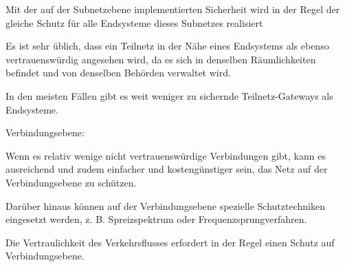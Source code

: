 \documentclass[a4paper]{article}
\begin{document}
\begin{multicols}{3}
\begin{itemize*}
\begin{itemize*}
                  \begin{itemize*}
                        \item Mit der auf der Subnetzebene implementierten Sicherheit wird in der Regel der gleiche Schutz für alle Endsysteme dieses Subnetzes realisiert
                  \end{itemize*}
                  \item Es ist sehr üblich, dass ein Teilnetz in der Nähe eines Endsystems als ebenso vertrauenswürdig angesehen wird, da es sich in denselben Räumlichkeiten befindet und von denselben Behörden verwaltet wird.
                  \item In den meisten Fällen gibt es weit weniger zu sichernde Teilnetz-Gateways als Endsysteme.
            \end{itemize*}
            \item Verbindungsebene:
            \begin{itemize*}
                  \item Wenn es relativ wenige nicht vertrauenswürdige Verbindungen gibt, kann es ausreichend und zudem einfacher und kostengünstiger sein, das Netz auf der Verbindungsebene zu schützen.
                  \item Darüber hinaus können auf der Verbindungsebene spezielle Schutztechniken eingesetzt werden, z. B. Spreizspektrum oder Frequenzsprungverfahren.
                  \item Die Vertraulichkeit des Verkehrsflusses erfordert in der Regel einen Schutz auf Verbindungsebene.
            \end{itemize*}
      \end{itemize*}


\end{multicols}
\end{document}

